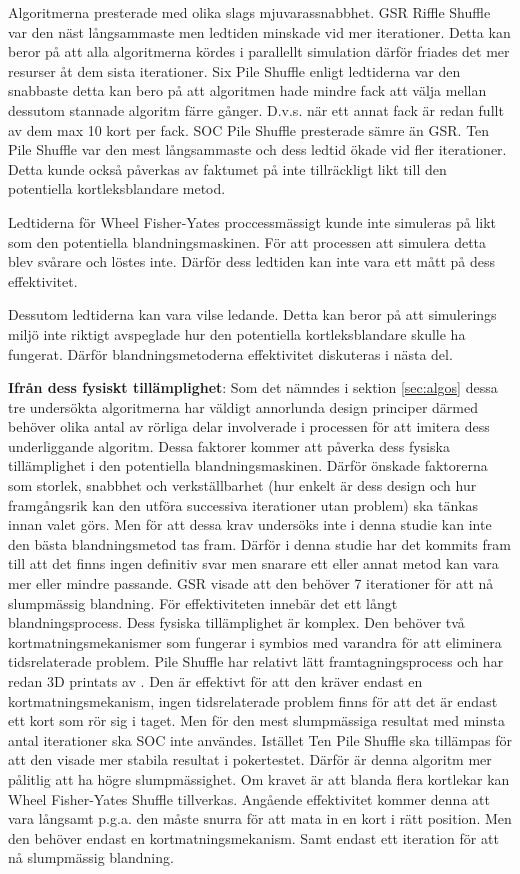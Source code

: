 \documentclass[swedish,a4paper]{article}
\begin{document}
Algoritmerna presterade med olika slags mjuvarassnabbhet. GSR Riffle Shuffle var
den näst långsammaste men ledtiden minskade vid mer iterationer. Detta kan
beror på att alla algoritmerna kördes i parallellt simulation därför friades det
mer resurser åt dem sista iterationer. Six Pile Shuffle enligt ledtiderna var
den snabbaste detta kan bero på att algoritmen hade mindre fack att välja mellan
dessutom stannade algoritm färre gånger. D.v.s. när ett annat fack är redan
fullt av dem max 10 kort per fack. SOC Pile Shuffle presterade sämre än GSR. Ten
Pile Shuffle var den mest långsammaste och dess ledtid ökade vid fler
iterationer. Detta kunde också påverkas av faktumet på inte tillräckligt likt
till den potentiella kortleksblandare metod.

Ledtiderna för Wheel Fisher-Yates proccessmässigt kunde inte simuleras på likt
som den potentiella blandningsmaskinen. För att processen att simulera detta
blev svårare och löstes inte.  Därför dess ledtiden kan inte vara ett mått på
dess effektivitet.

Dessutom ledtiderna kan vara vilse ledande. Detta kan beror på att
simulerings miljö inte riktigt avspeglade hur den potentiella kortleksblandare
skulle ha fungerat. Därför blandningsmetoderna effektivitet diskuteras i nästa
del.


\textbf{Ifrån dess fysiskt tillämplighet}:
Som det nämndes i sektion \ref{sec:algos} dessa tre undersökta algoritmerna har
väldigt annorlunda design principer därmed behöver olika antal av rörliga delar
involverade i processen för att imitera dess underliggande algoritm. Dessa
faktorer kommer att påverka dess fysiska tillämplighet i den potentiella
blandningsmaskinen. Därför önskade faktorerna som storlek, snabbhet och
verkställbarhet (hur enkelt är dess design och  hur framgångsrik kan den utföra
successiva iterationer utan problem) ska tänkas innan valet görs. Men för att
dessa krav undersöks inte i denna studie kan inte den bästa blandningsmetod tas
fram. Därför i denna studie har det kommits fram till att det finns ingen
definitiv svar men snarare ett eller annat metod kan vara mer eller mindre
passande. GSR visade att den behöver 7 iterationer för att nå slumpmässig
blandning. För effektiviteten innebär det ett långt blandningsprocess. Dess
fysiska tillämplighet är komplex. Den behöver två kortmatningsmekanismer som
fungerar i symbios med varandra för att eliminera tidsrelaterade problem. Pile Shuffle
har relativt lätt framtagningsprocess och har redan 3D printats av
\parencite{3DprintedLife2021}. Den är effektivt för att den kräver endast en
kortmatningsmekanism, ingen tidsrelaterade problem finns för att det är endast ett kort
som rör sig i taget. Men för den mest slumpmässiga resultat med minsta antal
iterationer ska SOC inte användes. Istället Ten Pile Shuffle ska tillämpas för
att den visade mer stabila resultat i pokertestet. Därför är denna algoritm mer
pålitlig att ha högre slumpmässighet. Om kravet är att blanda flera
kortlekar kan Wheel Fisher-Yates Shuffle tillverkas.  Angående effektivitet kommer
denna att vara långsamt p.g.a. den måste snurra för att mata in en kort i
rätt position. Men den behöver endast en kortmatningsmekanism. Samt endast ett
iteration för att nå slumpmässig blandning.
\end{document}
